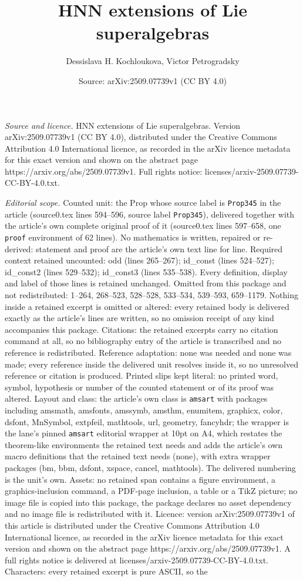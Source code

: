 \documentclass[10pt,a4paper]{amsart}
\title[HNN extensions of Lie superalgebras]{HNN extensions of Lie superalgebras}
\author{Dessislava H. Kochloukova, Victor Petrogradsky}
\date{Source: arXiv:2509.07739v1 (CC BY 4.0)}
\begin{document}
\maketitle

\noindent\emph{Source and licence.} HNN extensions of Lie superalgebras. Version arXiv:2509.07739v1 (CC BY 4.0), distributed under the Creative Commons Attribution 4.0 International licence, as recorded in the arXiv licence metadata for this exact version and shown on the abstract page https://arxiv.org/abs/2509.07739v1. Full rights notice: licenses/arxiv-2509.07739-CC-BY-4.0.txt.\par\smallskip

\noindent\textit{Editorial scope.} Counted unit: the Prop whose source label is \texttt{Prop345} in the article (source0.tex lines 594--596, source label \texttt{Prop345}), delivered together with the article's own complete original proof of it (source0.tex lines 597--658, one \texttt{proof} environment of 62 lines). No mathematics is written, repaired or re-derived: statement and proof are the article's own text line for line. Required context retained uncounted: odd (lines 265--267); id\_const (lines 524--527); id\_const2 (lines 529--532); id\_const3 (lines 535--538). Every definition, display and label of those lines is retained unchanged. Omitted from this package and not redistributed: 1--264, 268--523, 528--528, 533--534, 539--593, 659--1179. Nothing inside a retained excerpt is omitted or altered: every retained body is delivered exactly as the article's lines are written, so no omission receipt of any kind accompanies this package. Citations: the retained excerpts carry no citation command at all, so no bibliography entry of the article is transcribed and no reference is redistributed. Reference adaptation: none was needed and none was made; every reference inside the delivered unit resolves inside it, so no unresolved reference or citation is produced. Printed slips kept literal: no printed word, symbol, hypothesis or number of the counted statement or of its proof was altered. Layout and class: the article's own class is \texttt{amsart} with packages including amsmath, amsfonts, amssymb, amsthm, enumitem, graphicx, color, dsfont, MnSymbol, extpfeil, mathtools, url, geometry, fancyhdr; the wrapper is the lane's pinned \texttt{amsart} editorial wrapper at 10pt on A4, which restates the theorem-like environments the retained text needs and adds the article's own macro definitions that the retained text needs (none), with extra wrapper packages (bm, bbm, dsfont, xspace, cancel, mathtools). The delivered numbering is the unit's own. Assets: no retained span contains a figure environment, a graphics-inclusion command, a PDF-page inclusion, a table or a TikZ picture; no image file is copied into this package, the package declares no asset dependency and no image file is redistributed with it. Licence: version arXiv:2509.07739v1 of this article is distributed under the Creative Commons Attribution 4.0 International licence, as recorded in the arXiv licence metadata for this exact version and shown on the abstract page https://arxiv.org/abs/2509.07739v1. A full rights notice is delivered at licenses/arxiv-2509.07739-CC-BY-4.0.txt. Characters: every retained excerpt is pure ASCII, so the 
\end{document}
